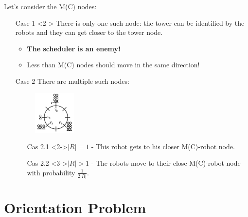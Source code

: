 \documentclass{beamer}
\begin{document}
\begin{frame}

	Let's consider the M(C) nodes:
	\begin{itemize}
		\item[Case 1]<2-> There is only one such node: the tower can be identified by the robots and they can get closer to the tower node.
		\begin{itemize}
			\item<3-> \textbf{The scheduler is an enemy!}
			\item<3-> Less than M(C) nodes should move in the same direction! 
		\end{itemize}
	\end{itemize}

\end{frame}

\begin{frame}
	\begin{itemize}
		\item[Case 2] There are multiple such nodes:
			\begin{figure}[h]
   				\includegraphics[width=0.2\textwidth]{images/random_configuration.png}
			\end{figure}
			\begin{itemize}
				\item[Cas 2.1]<2->$|R| = 1$ - This robot gets to his closer M(C)-robot node. 
				\item[Cas 2.2]<3->$|R| > 1$ - The robots move to their close M(C)-robot node with probability $\frac{1}{2|R|}$.
			\end{itemize}
	\end{itemize}
\end{frame}





\section{Orientation Problem}
\begin{frame}
\end{frame}
\end{document}
